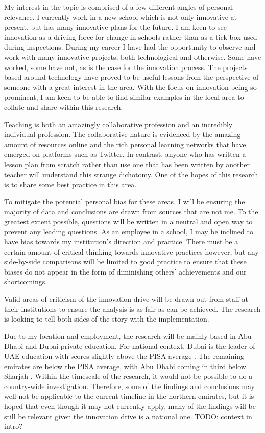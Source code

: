 My interest in the topic is comprised of a few different angles of personal relevance. I currently work in a new school which is not only innovative at present, but has many innovative plans for the future. I am keen to see innovation as a driving force for change in schools rather than as a tick box used during inspections. During my career I have had the opportunity to observe and work with many innovative projects, both technological and otherwise. Some have worked, some have not, as is the case for the innovation process. The projects based around technology have proved to be useful lessons from the perspective of someone with a great interest in the area. With the focus on innovation being so prominent, I am keen to be able to find similar examples in the local area to collate and share within this research.

Teaching is both an amazingly collaborative profession and an incredibly individual profession. The collaborative nature is evidenced by the amazing amount of resources online and the rich personal learning networks that have emerged on platforms such as Twitter. In contrast, anyone who has written a lesson plan from scratch rather than use one that has been written by another teacher will understand this strange dichotomy. One of the hopes of this research is to share some best practice in this area.

To mitigate the potential personal bias for these areas, I will be ensuring the majority of data and conclusions are drawn from sources that are not me. To the greatest extent possible, questions will be written in a neutral and open way to prevent any leading questions.
As an employee in a school, I may be inclined to have bias towards my institution's direction and practice. There must be a certain amount of critical thinking towards innovative practices however, but any side-by-side comparisons will be limited to good practice to ensure that these biases do not appear in the form of diminishing others’ achievements and our shortcomings. 

Valid areas of criticism of the innovation drive will be drawn out from staff at their institutions to ensure the analysis is as fair as can be achieved. The research is looking to tell both sides of the story with the implementation.

Due to my location and employment, the research will be mainly based in Abu Dhabi and Dubai private education. For national context, Dubai is the leader of UAE education with scores slightly above the PISA average \cite{2013}. The remaining emirates are below the PISA average, with Abu Dhabi coming in third below Sharjah \cite{2013}. Within the timescale of the research, it would not be possible to do a country-wide investigation. Therefore, some of the findings and conclusions may well not be applicable to the current timeline in the northern emirates, but it is hoped that even though it may not currently apply, many of the findings will be still be relevant given the innovation drive is a national one. TODO: context in intro?